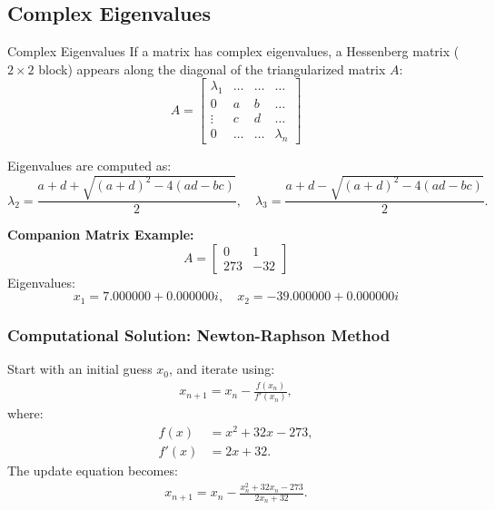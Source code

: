 \documentclass{beamer}
\numberwithin{equation}{section}
\begin{document}
\subsection{Complex Eigenvalues}
\begin{frame}{Complex Eigenvalues}
If a matrix has complex eigenvalues, a Hessenberg matrix (\( 2 \times 2 \) block) appears along the diagonal of the triangularized matrix \( A \):
\[
A = 
\begin{bmatrix}
\lambda_1 & \dots & \dots & \dots \\
0 & a & b & \dots \\
\vdots & c & d & \dots \\
0 & \dots & \dots & \lambda_n
\end{bmatrix}
\]

Eigenvalues are computed as:
\[
\lambda_2 = \dfrac{a + d + \sqrt{(a + d)^2 - 4(ad - bc)}}{2}, \quad
\lambda_3 = \dfrac{a + d - \sqrt{(a + d)^2 - 4(ad - bc)}}{2}.
\]

\textbf{Companion Matrix Example:}
\[
A = \begin{bmatrix} 0 & 1 \\ 273 & -32 \end{bmatrix}
\]
Eigenvalues:
\[
x_1 = 7.000000 + 0.000000i, \quad x_2 = -39.000000 + 0.000000i
\]
\end{frame}
\begin{frame}
\frametitle{Computational Solution: Newton-Raphson Method}
Start with an initial guess $x_0$, and iterate using:
\begin{align}
    x_{n+1} = x_n - \frac{f(x_n)}{f'(x_n)},
\end{align}
where:
\begin{align}
    f(x) &= x^2 + 32x - 273, \\
    f'(x) &= 2x + 32.
\end{align}
The update equation becomes:
\begin{align}
    x_{n+1} = x_n - \frac{x_n^2 + 32x_n - 273}{2x_n + 32}.
\end{align}
\end{frame}
\end{document}
